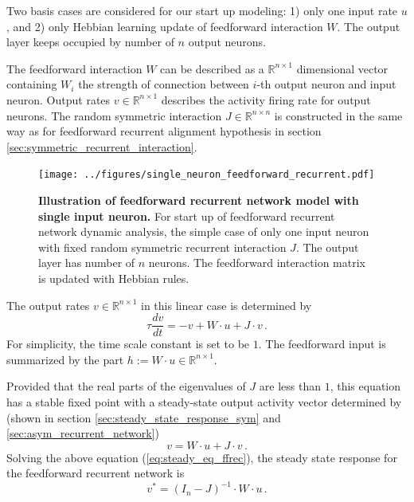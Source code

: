 \documentclass[11pt]{article}
\begin{document}
	Two basis cases are considered for our start up modeling: 1) only one input rate $u$, and 2) only Hebbian learning update of feedforward interaction $W$. The output layer keeps occupied by number of $n$ output neurons. 
	
	The feedforward interaction $W$ can be described as a $\mathbb{R}^{n \times 1}$ dimensional vector containing $W_i$ the strength of connection between $i$-th output neuron and input neuron. Output rates $v \in \mathbb{R}^{n \times 1}$ describes the activity firing rate for output neurons. The random symmetric interaction $J \in \mathbb{R}^{n \times n}$ is constructed in the same way as for feedforward recurrent alignment hypothesis in section \ref{sec:symmetric_recurrent_interaction}. 
	
		\begin{figure}[H]
			\centering
			\texttt{[image: ../figures/single\_neuron\_feedforward\_recurrent.pdf]}
			\caption{\textbf{Illustration of feedforward recurrent network model with single input neuron.} For start up of feedforward recurrent network dynamic analysis, the simple case of only one input neuron with fixed random symmetric recurrent interaction $J$. The output layer has number of $n$ neurons. The feedforward interaction matrix is updated with Hebbian rules.}
			\label{fig:single_neuron_feedforward_recurrent_network}
		\end{figure}
	
	The output rates $v \in \mathbb{R}^{n \times 1}$ in this linear case is determined by 
		\begin{equation} \label{eq:response_ffrec_network}
			\tau \frac{dv}{dt} = -v + W \cdot u + J \cdot v \,.
		\end{equation}
	For simplicity, the time scale constant is set to be $1$. The feedforward input is summarized by the part $h := W \cdot u \in \mathbb{R}^{n \times 1}$.  
	
	Provided that the real parts of the eigenvalues of $J$ are less than $1$, this equation has a stable fixed point with a steady-state output activity vector determined by (shown in section \ref{sec:steady_state_response_sym} and \ref{sec:asym_recurrent_network})
		\begin{equation} \label{eq:steady_eq_ffrec}
			v = W \cdot u + J \cdot v \, .
		\end{equation}
	Solving the above equation (\ref{eq:steady_eq_ffrec}), the steady state response for the feedforward recurrent network is
		\begin{equation} \label{eq:steady_state_ffrec}
			v^* = (I_n - J)^{-1} \cdot W \cdot u \, .
		\end{equation}
	
\end{document}
